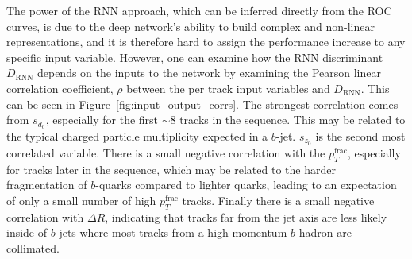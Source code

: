 

The power of the RNN approach, which can be inferred directly from the ROC curves, is due to the deep network’s ability to build complex and non-linear representations, and it is therefore hard to assign the performance increase to any specific input variable.
However, one can examine how the RNN discriminant $D_{\mathrm{RNN}}$ depends on the inputs to the network by examining the Pearson linear correlation coefficient, $\rho$ between the per track input variables and $D_{\mathrm{RNN}}$.  This can be seen in Figure~\ref{fig:input_output_corrs}.  The strongest correlation comes from $s_{d_0}$, especially for the first  $\sim8$ tracks in the sequence.  This may be related to the typical charged particle multiplicity expected in a $b$-jet. $s_{z_0}$ is the second most correlated variable. There is a small negative correlation with the $p_T^{\textrm{frac}}$, especially for tracks later in the sequence, which may be related to the harder fragmentation of $b$-quarks compared to lighter quarks, leading to an expectation of only a small number of high $p_T^{\textrm{frac}}$ tracks. Finally there is a small negative correlation with $\Delta R$, indicating that tracks far from the jet axis are less likely inside of $b$-jets where most tracks from a high momentum $b$-hadron are collimated.

